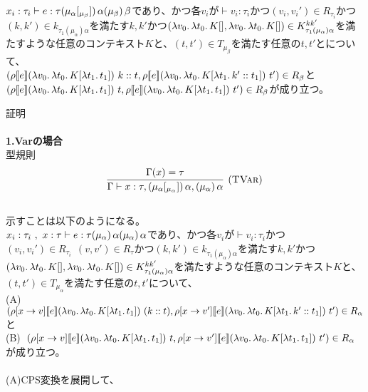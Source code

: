 \setcounter{definition}{7}
\begin{theorem}[メイン定理]
  $x_i:\tau_i \vdash e:\tau (\mu_{\alpha}\lbrack \tiny{_{\mu_{\beta}}} \rbrack)\,\alpha (\mu_{\beta})\,\beta$であり、かつ各$v_i$が$\vdash v_i:\tau_i$かつ$(v_i,v_i') \in R_{\tau_i}$かつ$(k,k')\in k_{\tau_1(\mu_{\alpha})\alpha}$を満たす$k,k'$かつ$(\lambda{v_0}.\,{\lambda{t_0}.\,{K[]}}, \lambda{v_0}.\,{\lambda{t_0}.\,{K[]}})\in  K^{kk'}_{\tau_1(\mu_{\alpha})\alpha}$を満たすような任意のコンテキスト$K$と、$(t, t') \in T_{\mu_{\beta}}$を満たす任意の$t, t'$とについて、\\
  $(\rho [\![{e}]\!] (\lambda{v_0}.\,{\lambda{t_0}.\,{K[\lambda{t_1}.\,{t_1}]}})\ k::t, \rho [\![{e}]\!] (\lambda{v_0}.\,{\lambda{t_0}.\,{K[\lambda{t_1}.\,{k'::t_1}]}})\ t')\in R_{\beta}$と\\
  $(\rho [\![{e}]\!] (\lambda{v_0}.\,{\lambda{t_0}.\,{K[\lambda{t_1}.\,{t_1}]}})\ t, \rho [\![{e}]\!] (\lambda{v_0}.\,{\lambda{t_0}.\,{K[\lambda{t_1}.\,{t_1}]}})\ t')\in R_{\beta}$が成り立つ。
\end{theorem}
\lbrack 証明 \rbrack\\\\
\textbf{1.Varの場合}\\
型規則
\[
\begin{array}{c}
\infer[\TVar]
      {\JudgeTrail{\Gamma}{x}{\tau}{\TrailsType{\alpha}{\alpha}}
                                   {\TrailType{\alpha}}}
      {\Gamma(x)=\tau}
\end{array}
\]
\\
示すことは以下のようになる。\\
$x_i:\tau_i\ ,\ x:\tau\vdash e:\tau (\mu_{\alpha})\,\alpha (\mu_{\alpha})\,\alpha$であり、かつ各$v_i$が$\vdash v_i:\tau_i$かつ$(v_i,v_i') \in R_{\tau_i}\ \ (v,v')\in R_{\tau}$かつ$(k,k')\in k_{\tau_1(\mu_{\alpha})\alpha}$を満たす$k,k'$かつ$(\lambda{v_0}.\,{\lambda{t_0}.\,{K[]}}, \lambda{v_0}.\,{\lambda{t_0}.\,{K[]}})\in  K^{kk'}_{\tau_1(\mu_{\alpha})\alpha}$を満たすような任意のコンテキスト$K$と、$(t, t') \in T_{\mu_{\alpha}}$を満たす任意の$t, t'$について、\\
  (A)\ $(\rho[x \rightarrow v] [\![{e}]\!] (\lambda{v_0}.\,{\lambda{t_0}.\,{K[\lambda{t_1}.\,{t_1}]}})\ (k::t), \rho[x \rightarrow v'] [\![{e}]\!] (\lambda{v_0}.\,{\lambda{t_0}.\,{K[\lambda{t_1}.\,{k'::t_1}]}})\ t')\in R_{\alpha}$と\\
  (B)\ $(\rho[x \rightarrow v] [\![{e}]\!] (\lambda{v_0}.\,{\lambda{t_0}.\,{K[\lambda{t_1}.\,{t_1}]}})\ t, \rho[x \rightarrow v'] [\![{e}]\!] (\lambda{v_0}.\,{\lambda{t_0}.\,{K[\lambda{t_1}.\,{t_1}]}})\ t')\in R_{\alpha}$が成り立つ。\\
\\
(A)CPS変換を展開して、\\
